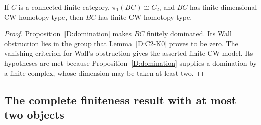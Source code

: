\begin{corollary}
\label{D:C2-finite}
If $C$ is a connected finite category, $\pi_1(BC)\cong C_2$, and
$BC$ has finite-dimensional CW homotopy type, then $BC$ has finite
CW homotopy type.
\end{corollary}
\begin{proof}
Proposition~\ref{D:domination} makes $BC$ finitely dominated.
Its Wall obstruction lies in the group that
Lemma~\ref{D:C2-K0} proves to be zero.  The vanishing criterion for
Wall's obstruction \cite[Theorem F, p.~66]{wall1965D} gives the
asserted finite CW model.  Its hypotheses are met because
Proposition~\ref{D:domination} supplies a domination by a finite
complex, whose dimension may be taken at least two.
\end{proof}

\subsection{The complete finiteness result with at most two objects}

